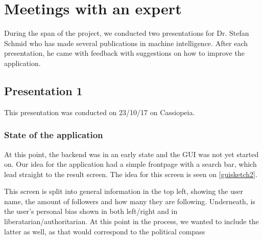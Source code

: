 \section{Meetings with an expert} \label{expMeeting}
During the span of the project, we conducted two presentations for Dr. Stefan
Schmid who has made several publications in machine intelligence. After
each presentation, he came with feedback with suggestions on how to improve the
application. 
\subsection{Presentation 1}
This presentation was conducted on 23/10/17 on Cassiopeia.
\subsubsection{State of the application}
At this point, the backend was in an early state and the \ac{GUI} was not yet
started on. Our idea for the application had a simple frontpage with a search
bar, which lead straight to the result screen. The idea for this screen is seen
on \autoref{guisketch2}.


This screen is split into general information in the top left, showing the user
name, the amount of followers and how many they are following. Underneath, is
the user's personal bias shown in both left/right and in
liberatarian/authoritarian. At this point in the process, we wanted to include
the latter as well, as that would correspond to the political compass

